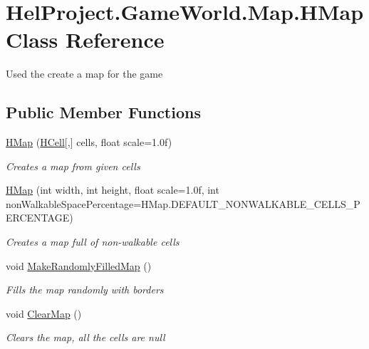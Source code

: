 \hypertarget{class_hel_project_1_1_game_world_1_1_map_1_1_h_map}{}\section{Hel\+Project.\+Game\+World.\+Map.\+H\+Map Class Reference}
\label{class_hel_project_1_1_game_world_1_1_map_1_1_h_map}


Used the create a map for the game  


\subsection*{Public Member Functions}
\begin{DoxyCompactItemize}
\item 
\hyperlink{class_hel_project_1_1_game_world_1_1_map_1_1_h_map_a392c8a341df9fe757320121d8d7ccd08}{H\+Map} (\hyperlink{class_hel_project_1_1_game_world_1_1_map_1_1_h_cell}{H\+Cell}\mbox{[},\mbox{]} cells, float scale=1.\+0f)
\begin{DoxyCompactList}\small\item\em Creates a map from given cells \end{DoxyCompactList}\item 
\hyperlink{class_hel_project_1_1_game_world_1_1_map_1_1_h_map_a7318bd52a1e87a96da5094cc2b6bd019}{H\+Map} (int width, int height, float scale=1.\+0f, int non\+Walkable\+Space\+Percentage=\+H\+Map.\+D\+E\+F\+A\+U\+L\+T\+\_\+\+N\+O\+N\+W\+A\+L\+K\+A\+B\+L\+E\+\_\+\+C\+E\+L\+L\+S\+\_\+\+P\+E\+R\+C\+E\+N\+T\+A\+G\+E)
\begin{DoxyCompactList}\small\item\em Creates a map full of non-\/walkable cells \end{DoxyCompactList}\item 
void \hyperlink{class_hel_project_1_1_game_world_1_1_map_1_1_h_map_a50af4bbf5a7d9fd131c70050798230a1}{Make\+Randomly\+Filled\+Map} ()
\begin{DoxyCompactList}\small\item\em Fills the map randomly with borders \end{DoxyCompactList}\item 
void \hyperlink{class_hel_project_1_1_game_world_1_1_map_1_1_h_map_a866544b2e9b7f536371acf03c7b35403}{Clear\+Map} ()
\begin{DoxyCompactList}\small\item\em Clears the map, all the cells are null \end{DoxyCompactList}\item 

\end{DoxyCompactItemize}
